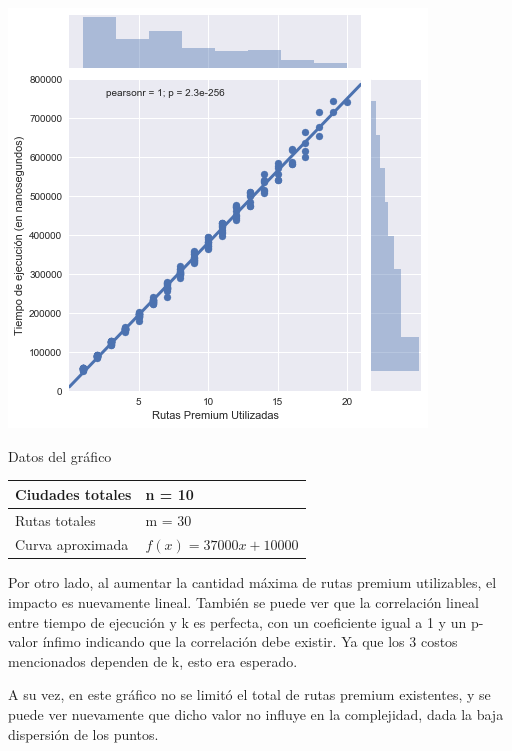 \noindent
\begin{minipage}{0.55\textwidth}
	\hfill
	\includegraphics[scale=0.6]{imagenes/ej1-4-fib.png}
\end{minipage}
\hfill
\begin{minipage}{0.44\textwidth}
	\begin{center}
		Datos del gráfico

		\begin{tabular}{ | l l |}
			\hline
			Ciudades totales & n = 10 \\ \hline
			Rutas totales & m = 30 \\ \hline
			Curva aproximada & $f(x) = 37000 x + 10000$ \\
			\hline
		\end{tabular}
	\end{center}
\end{minipage}

Por otro lado, al aumentar la cantidad máxima de rutas premium utilizables, el impacto es nuevamente lineal. También se puede ver que la correlación lineal entre tiempo de ejecución y k es perfecta, con un coeficiente igual a 1 y un p-valor ínfimo indicando que la correlación debe existir. Ya que los 3 costos mencionados dependen de k, esto era esperado.

A su vez, en este gráfico no se limitó el total de rutas premium existentes, y se puede ver nuevamente que dicho valor no influye en la complejidad, dada la baja dispersión de los puntos.